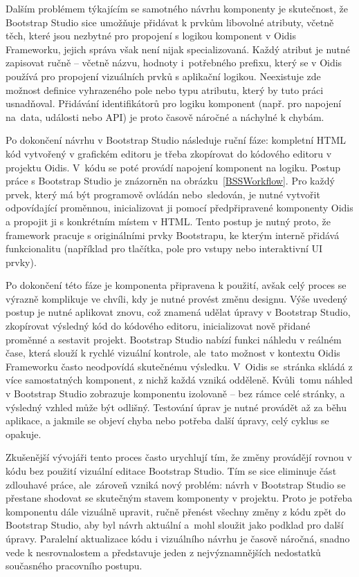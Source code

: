 Dalším problémem týkajícím se samotného návrhu komponenty je skutečnost, že Bootstrap Studio sice umožňuje přidávat k prvkům libovolné atributy, včetně těch, které jsou nezbytné pro propojení s logikou komponent v Oidis Frameworku, jejich správa však není nijak specializovaná. Každý atribut je nutné zapisovat ručně -- včetně názvu, hodnoty i~potřebného prefixu, který se v Oidis používá pro propojení vizuálních prvků s aplikační logikou. Neexistuje zde možnost definice vyhrazeného pole nebo typu atributu, který by tuto práci usnadňoval. Přidávání identifikátorů pro logiku komponent (např. pro napojení na~data, události nebo API) je proto časově náročné a náchylné k chybám.

Po dokončení návrhu v Bootstrap Studio následuje ruční fáze: kompletní HTML kód vytvořený v grafickém editoru je třeba zkopírovat do kódového editoru v projektu Oidis. V~kódu se poté provádí napojení komponent na logiku. Postup práce s Bootstrap Studio je znázorněn na obrázku~\ref{BSSWorkflow}. Pro každý prvek, který má být programově ovládán nebo~sledován, je nutné vytvořit odpovídající proměnnou, inicializovat ji pomocí předpřipravené komponenty Oidis a propojit ji s konkrétním místem v HTML. Tento postup je nutný proto, že framework pracuje s originálními prvky Bootstrapu, ke kterým interně přidává funkcionalitu (například pro tlačítka, pole pro vstupy nebo interaktivní UI prvky).

Po dokončení této fáze je komponenta připravena k použití, avšak celý proces se výrazně komplikuje ve chvíli, kdy je nutné provést změnu designu. Výše uvedený postup je nutné aplikovat znovu, což znamená udělat úpravy v Bootstrap Studio, zkopírovat výsledný kód do kódového editoru, inicializovat nově přidané proměnné a sestavit projekt. Bootstrap Studio nabízí funkci náhledu v reálném čase, která slouží k rychlé vizuální kontrole, ale~tato možnost v kontextu Oidis Frameworku často neodpovídá skutečnému výsledku. V~Oidis se~stránka skládá z více samostatných komponent, z nichž každá vzniká odděleně. Kvůli~tomu náhled v Bootstrap Studio zobrazuje komponentu izolovaně -- bez rámce celé stránky, a výsledný vzhled může být odlišný. Testování úprav je nutné provádět až za běhu aplikace, a jakmile se objeví chyba nebo potřeba další úpravy, celý cyklus se opakuje.

Zkušenější vývojáři tento proces často urychlují tím, že změny provádějí rovnou v kódu bez použití vizuální editace Bootstrap Studio. Tím se sice eliminuje část zdlouhavé práce, ale~zároveň vzniká nový problém: návrh v Bootstrap Studio se přestane shodovat se skutečným stavem komponenty v projektu. Proto je potřeba komponentu dále vizuálně upravit, ručně přenést všechny změny z kódu zpět do Bootstrap Studio, aby byl návrh aktuální a~mohl sloužit jako podklad pro další úpravy. Paralelní aktualizace kódu i vizuálního návrhu je časově náročná, snadno vede k nesrovnalostem a představuje jeden z nejvýznamnějších nedostatků současného pracovního postupu. 

